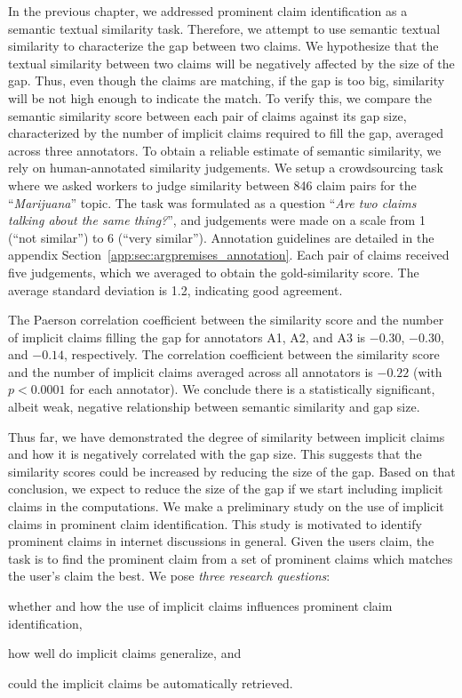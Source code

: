 In the previous chapter, we addressed prominent claim identification as a semantic
textual similarity task. 
Therefore, we attempt to use semantic textual similarity to characterize the gap
between two claims. 
We hypothesize that the textual similarity between two claims will be
negatively affected by the size of the gap. 
Thus, even though the claims are matching, if the gap is too big, similarity will be not 
high enough to indicate the match. 
To verify this, we compare the semantic similarity score between each pair of 
claims against its gap size, characterized by the number of implicit claims
required to fill the gap, 
averaged across three annotators. 
To obtain a reliable estimate of semantic similarity, we rely on human-annotated 
similarity judgements. 
We setup a crowdsourcing task where we asked workers to judge similarity
between 846 claim pairs for the ``\emph{Marijuana}'' topic. 
The task was formulated as a question ``\emph{Are two claims
talking about the same thing?}'', and judgements were made on a scale
from 1 (``not similar'') to 6 (``very similar''). 
Annotation guidelines are detailed in the appendix
Section~\ref{app:sec:argpremises_annotation}. 
Each pair of claims received five judgements, which we averaged to obtain the
gold-similarity score. 
The average standard deviation is 1.2, indicating good agreement. 

The Paerson correlation coefficient  between the similarity score and the
number of implicit claims filling the gap for annotators A1, A2, and A3 is
$-0.30$, $-0.30$, and $-0.14$, respectively.  The correlation coefficient between the
similarity score and the number of implicit claims averaged across all annotators is
$-0.22$ (with $p < 0.0001$ for each annotator).  We conclude there is a statistically significant,
albeit weak, negative relationship between semantic similarity and gap size. 

Thus far, we have demonstrated the degree of similarity between implicit 
claims and how it is negatively correlated with the gap size. 
This suggests that the similarity scores could be increased by reducing the size 
of the gap.
Based on that conclusion, we expect to reduce the size of the gap if we start
including implicit claims in the computations. 
We make a preliminary study on the use of implicit claims in prominent claim
identification.
This study is motivated to identify prominent claims in internet discussions in
general.
Given the users claim, the task is to find the prominent claim from a set of 
prominent claims which matches the user's claim the best. 
We pose \emph{three research questions}: 
\begin{enumerate*}[label=(\arabic*)]
\item whether and how the use of implicit claims influences prominent claim identification, 
\item how well do implicit claims generalize, and 
\item could the implicit claims be automatically retrieved.
\end{enumerate*}

